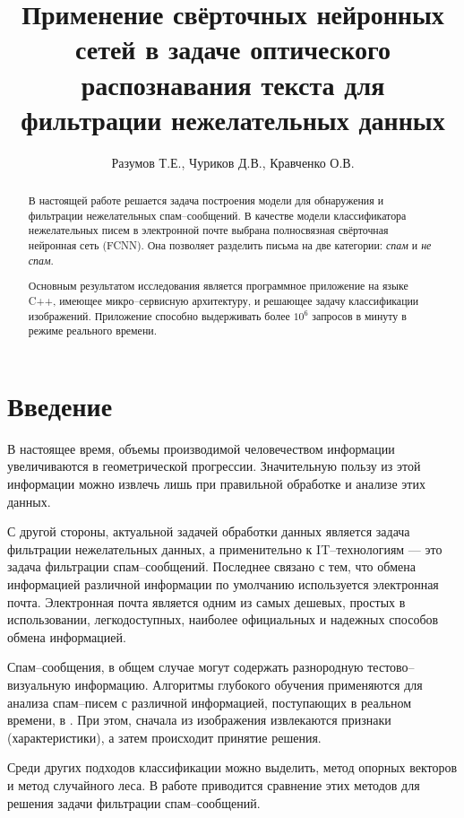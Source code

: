 \documentclass[12pt]{article}
\title{Применение свёрточных нейронных сетей в задаче оптического распознавания текста для фильтрации нежелательных данных}
\author{Разумов Т.Е., Чуриков Д.В., Кравченко О.В.}
\begin{document}
\maketitle

\begin{abstract}
В настоящей работе решается задача построения модели для обнаружения и фильтрации нежелательных спам--сообщений. В качестве модели классификатора нежелательных писем в электронной почте выбрана полносвязная свёрточная нейронная сеть (\textsf{FCNN}). Она позволяет разделить письма на две категории: \emph{спам} и \emph{не спам}. 

Основным результатом исследования является программное приложение на языке \textsf{C++}, имеющее микро--сервисную архитектуру, и решающее задачу классификации изображений. Приложение способно выдерживать более $10^6$ запросов в минуту в режиме реального времени.
\end{abstract}


\section{Введение}
В настоящее время, объемы производимой человечеством информации
увеличиваются в геометрической прогрессии. Значительную пользу из этой информации можно извлечь лишь при правильной обработке и анализе этих данных. 

С другой стороны, актуальной задачей обработки данных является задача
фильтрации нежелательных данных, а применительно к IT--технологиям --- это задача фильтрации спам--сообщений.
Последнее связано с тем, что обмена информацией различной информации по умолчанию используется электронная почта. Электронная почта является одним из самых дешевых, простых в использовании, легкодоступных, наиболее официальных и надежных способов обмена информацией. 

Спам--сообщения, в общем случае могут содержать разнородную тестово--визуальную информацию. Алгоритмы глубокого
обучения применяются для анализа спам--писем с различной информацией, поступающих в реальном времени, в \cite{Makkar2021}.
При этом, сначала из изображения извлекаются признаки (характеристики),
а затем происходит принятие решения. 


Среди других подходов классификации можно выделить, метод опорных векторов и метод случайного леса. В работе \cite{Taylor2020} приводится сравнение этих методов для решения задачи фильтрации спам--сообщений.
\end{document}
